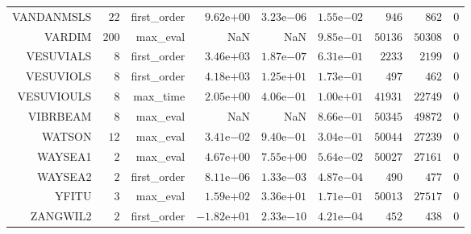 \begin{longtable}{rrrrrrrrr}
VANDANMSLS & \(    22\) & first\_order & \( 9.62\)e\(+00\) & \( 3.23\)e\(-06\) & \( 1.55\)e\(-02\) & \(   946\) & \(   862\) & \(     0\) \\
VARDIM & \(   200\) & max\_eval &       NaN &       NaN & \( 9.85\)e\(-01\) & \( 50136\) & \( 50308\) & \(     0\) \\
VESUVIALS & \(     8\) & first\_order & \( 3.46\)e\(+03\) & \( 1.87\)e\(-07\) & \( 6.31\)e\(-01\) & \(  2233\) & \(  2199\) & \(     0\) \\
VESUVIOLS & \(     8\) & first\_order & \( 4.18\)e\(+03\) & \( 1.25\)e\(+01\) & \( 1.73\)e\(-01\) & \(   497\) & \(   462\) & \(     0\) \\
VESUVIOULS & \(     8\) & max\_time & \( 2.05\)e\(+00\) & \( 4.06\)e\(-01\) & \( 1.00\)e\(+01\) & \( 41931\) & \( 22749\) & \(     0\) \\
VIBRBEAM & \(     8\) & max\_eval &       NaN &       NaN & \( 8.66\)e\(-01\) & \( 50345\) & \( 49872\) & \(     0\) \\
WATSON & \(    12\) & max\_eval & \( 3.41\)e\(-02\) & \( 9.40\)e\(-01\) & \( 3.04\)e\(-01\) & \( 50044\) & \( 27239\) & \(     0\) \\
WAYSEA1 & \(     2\) & max\_eval & \( 4.67\)e\(+00\) & \( 7.55\)e\(+00\) & \( 5.64\)e\(-02\) & \( 50027\) & \( 27161\) & \(     0\) \\
WAYSEA2 & \(     2\) & first\_order & \( 8.11\)e\(-06\) & \( 1.33\)e\(-03\) & \( 4.87\)e\(-04\) & \(   490\) & \(   477\) & \(     0\) \\
YFITU & \(     3\) & max\_eval & \( 1.59\)e\(+02\) & \( 3.36\)e\(+01\) & \( 1.71\)e\(-01\) & \( 50013\) & \( 27517\) & \(     0\) \\
ZANGWIL2 & \(     2\) & first\_order & \(-1.82\)e\(+01\) & \( 2.33\)e\(-10\) & \( 4.21\)e\(-04\) & \(   452\) & \(   438\) & \(     0\) \\\hline
\end{longtable}
